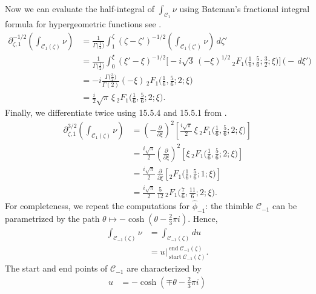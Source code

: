 \documentclass{article}
\newcommand{\fracderiv}[3]{\partial^{#1}_{#2, #3}}
\theoremstyle{definition}
\theoremstyle{plain}
\newenvironment{old}{\color{RoyalBlue}}{\color{black}}
\begin{document}
\begin{old}
Now we can evaluate the half-integral of $\int_{\mathcal{C}_1} \nu$ using Bateman's fractional integral formula for hypergeometric functions see \cite[Section 4.1]{koornwinder2015fractional}.
\begin{align*}
\fracderiv{-1/2}{\zeta}{1} \left( \int_{\mathcal{C}_1(\zeta)} \nu \right) & = \frac{1}{\Gamma\big(\tfrac{1}{2}\big)} \int_{1}^\zeta (\zeta - \zeta')^{-1/2} \left( \int_{\mathcal{C}_1(\zeta')} \nu \right)\,d\zeta' \\
& = \frac{1}{\Gamma\big(\tfrac{1}{2}\big)} \int_0^\xi  (\xi' - \xi)^{-1/2} \Big[ -{i}{\sqrt{3}}\, (-\xi)^{1/2}\,{}_2F_1\big(\tfrac{1}{6}, \tfrac{5}{6}; \tfrac{3}{2}; \xi\big) \Big] \,\big( -\,d\xi' \big) \\
& = -i \frac{\Gamma\big(\tfrac{3}{2}\big)}{\Gamma(2)} (-\xi)\,{}_2F_1\big(\tfrac{1}{6}, \tfrac{5}{6}; 2; \xi\big) \\
& = \frac{i}{2} \sqrt{\pi}\,\xi\, {}_2F_1\big(\tfrac{1}{6}, \tfrac{5}{6}; 2; \xi\big).
\end{align*}
Finally, we differentiate twice using 15.5.4 and 15.5.1 from \cite{dlmf}.
\begin{align*}
\fracderiv{3/2}{\zeta}{1} \left( \int_{\mathcal{C}_1(\zeta)} \nu \right) & = \left(-\tfrac{\partial}{\partial \xi}\right)^2 \left[ \frac{i\sqrt{\pi}}{2}\,\xi\, {}_2F_1\big(\tfrac{1}{6}, \tfrac{5}{6}; 2; \xi\big) \right] \\
& =  \tfrac{i\sqrt{\pi}}{2} \left(\tfrac{\partial}{\partial \xi}\right)^2 \left[ \xi\,{}_2F_1\big(\tfrac{1}{6}, \tfrac{5}{6}; 2; \xi\big) \right] \\
& = \tfrac{i\sqrt{\pi}}{2}\,\tfrac{\partial}{\partial \xi} \left[ {}_2F_1\big(\tfrac{1}{6}, \tfrac{5}{6}; 1; \xi\big) \right] \\
& = \tfrac{i\sqrt{\pi}}{2}\,\tfrac{5}{12}\, {}_2F_1\big(\tfrac{7}{6}, \tfrac{11}{6}; 2; \xi\big).
\end{align*}
%
For completeness, we repeat the computations for $\hat{\phi}_{-1}$: the thimble $\mathcal{C}_{-1}$ can be parametrized by the path $\theta \mapsto -\cosh(\theta - \tfrac{2}{3}\pi i)$. Hence,
\begin{align*}
\int_{\mathcal{C}_{-1}(\zeta)} \nu & = \int_{\mathcal{C}_{-1}(\zeta)} du \\
& = u \Big|_{\operatorname{start} \mathcal{C}_{-1}(\zeta)}^{\operatorname{end}\mathcal{C}_{-1}(\zeta)}.
\end{align*}
The start and end points of $\mathcal{C}_{-1}$ are characterized by
\begin{align*}
u & = -\cosh(\mp\theta - \tfrac{2}{3}\pi i) \\

\end{align*}
\end{old}
\end{document}
